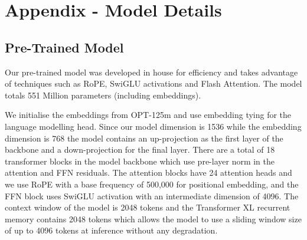 \begingroup
\setlength{\extrarowheight}{3pt}
\begin{table}[H]
\fontsize{8}{9}\selectfont
{}
\end{table}
\endgroup


\newpage
\section{Appendix - Model Details}
\subsection{Pre-Trained Model} \label{sec:pretrained-model}
Our pre-trained model was developed in house for efficiency and takes advantage of techniques such as RoPE, SwiGLU activations and Flash Attention. The model totals 551 Million parameters (including embeddings).

We initialise the embeddings from OPT-125m and use embedding tying for the language modelling head. Since our model dimension is 1536 while the embedding dimension is 768 the model contains an up-projection as the first layer of the backbone and a down-projection for the final layer. There are a total of 18 transformer blocks in the model backbone which use pre-layer norm in the attention and FFN residuals. The attention blocks have 24 attention heads and we use RoPE with a base frequency of 500,000 for positional embedding, and the FFN block uses SwiGLU activation with an intermediate dimension of 4096. The context window of the model is 2048 tokens and the Transformer XL recurrent memory contains 2048 tokens which allows the model to use a sliding window size of up to 4096 tokens at inference without any degradation.

